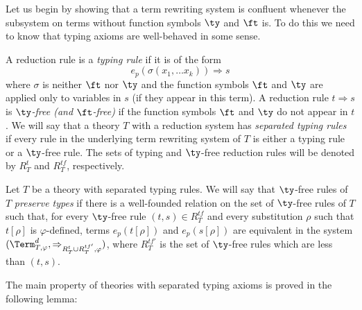 Let us begin by showing that a term rewriting system is confluent whenever the subsystem on terms without function symbols $\ty$ and $\ft$ is.
To do this we need to know that typing axioms are well-behaved in some sense.
\begin{defn}
A reduction rule is a \emph{typing rule} if it is of the form
\[ e_p(\sigma(x_1, \ldots x_k)) \Rightarrow s \]
where $\sigma$ is neither $\ft$ nor $\ty$ and the function symbols $\ft$ and $\ty$ are applied only to variables in $s$ (if they appear in this term).
A reduction rule $t \Rightarrow s$ is \emph{$\ty$-free (and $\ft$-free)} if the function symbols $\ft$ and $\ty$ do not appear in $t$.
We will say that a theory $T$ with a reduction system has \emph{separated typing rules} if every rule in the underlying term rewriting system of $T$ is either a typing rule or a $\ty$-free rule.
The sets of typing and $\ty$-free reduction rules will be denoted by $R^t_T$ and $R^{tf}_T$, respectively.

Let $T$ be a theory with separated typing rules.
We will say that $\ty$-free rules of $T$ \emph{preserve types} if there is a well-founded relation on the set of $\ty$-free rules of $T$ such that,
for every $\ty$-free rule $(t,s) \in R^{tf}_T$ and every substitution $\rho$ such that $t[\rho]$ is $\varphi$-defined,
terms $e_p(t[\rho])$ and $e_p(s[\rho])$ are equivalent in the system $(\Term_{T,\varphi}^d,\Rightarrow_{R^t_T \cup R^{tf'}_T, \varphi})$,
where $R^{tf'}_T$ is the set of $\ty$-free rules which are less than $(t,s)$.
\end{defn}

The main property of theories with separated typing axioms is proved in the following lemma:

